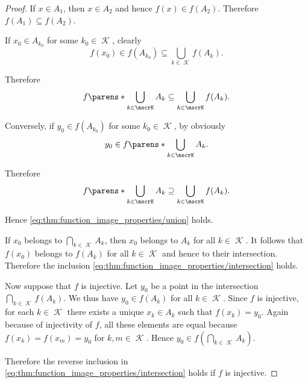 \begin{proof}
   If \( x \in A_1 \), then \( x \in A_2 \) and hence \( f(x) \in f(A_2) \). Therefore \( f(A_1) \subseteq f(A_2) \).

   If \( x_0 \in A_{k_0} \) for some \( k_0 \in \mscrK \), clearly
  \begin{equation*}
    f(x_0) \in f(A_{k_0}) \subseteq \bigcup_{k \in \mscrK} f(A_k).
  \end{equation*}

  Therefore
  \begin{equation*}
    f\parens*{ \bigcup_{k \in \mscrK} A_k } \subseteq \bigcup_{k \in \mscrK} f(A_k).
  \end{equation*}

  Conversely, if \( y_0 \in f(A_{k_0}) \) for some \( k_0 \in \mscrK \), by  obviously
  \begin{equation*}
    y_0 \in f\parens*{ \bigcup_{k \in \mscrK} A_k }.
  \end{equation*}

  Therefore
  \begin{equation*}
    f\parens*{ \bigcup_{k \in \mscrK} A_k } \supseteq \bigcup_{k \in \mscrK} f(A_k).
  \end{equation*}

  Hence \eqref{eq:thm:function_image_properties/union} holds.

   If \( x_0 \) belongs to \( \bigcap_{k \in \mscrK} A_k \), then \( x_0 \) belongs to \( A_k \) for all \( k \in \mscrK \). It follows that \( f(x_0) \) belongs to \( f(A_k) \) for all \( k \in \mscrK \) and hence to their intersection. Therefore the inclusion \eqref{eq:thm:function_image_properties/intersection} holds.

  Now suppose that \( f \) is injective. Let \( y_0 \) be a point in the intersection \( \bigcap_{k \in \mscrK} f(A_k) \). We thus have \( y_0 \in f(A_k) \) for all \( k \in \mscrK \). Since \( f \) is injective, for each \( k \in \mscrK \) there exists a unique \( x_k \in A_k \) such that \( f(x_k) = y_0 \). Again because of injectivity of \( f \), all these elements are equal because \( f(x_k) = f(x_m) = y_0 \) for \( k, m \in \mscrK \). Hence \( y_0 \in f(\bigcap_{k \in \mscrK} A_k) \).

  Therefore the reverse inclusion in \eqref{eq:thm:function_image_properties/intersection} holds if \( f \) is injective.


\end{proof}
